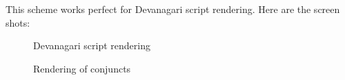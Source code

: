 This scheme works perfect for Devanagari script rendering. Here are the screen shots:

\begin{figure}[htbp]
\centerline{}
\caption{Devanagari script rendering} \label{Gnome Terminal10}
\end{figure}

\begin{figure}[htbp]
\centerline{}
\caption{Rendering of conjuncts} \label{Gnome Terminal11}
\end{figure}


